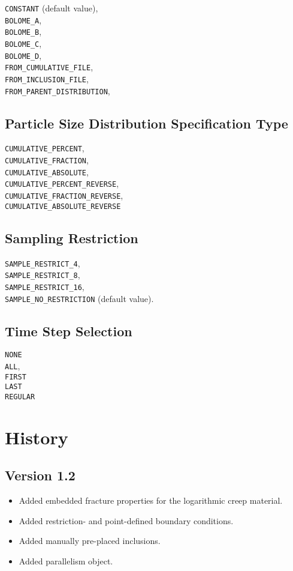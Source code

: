 \documentclass[10pt]{article}
\begin{document}
\verb+CONSTANT+ (default value),\\
\verb+BOLOME_A+,\\
\verb+BOLOME_B+,\\
\verb+BOLOME_C+,\\
\verb+BOLOME_D+,\\
\verb+FROM_CUMULATIVE_FILE+,\\
\verb+FROM_INCLUSION_FILE+,\\
\verb+FROM_PARENT_DISTRIBUTION+,\\

\subsection{Particle Size Distribution Specification Type}
	\verb+CUMULATIVE_PERCENT+,\\
	\verb+CUMULATIVE_FRACTION+,\\
	\verb+CUMULATIVE_ABSOLUTE+,\\
	\verb+CUMULATIVE_PERCENT_REVERSE+,\\
	\verb+CUMULATIVE_FRACTION_REVERSE+,\\
	\verb+CUMULATIVE_ABSOLUTE_REVERSE+


\subsection{Sampling Restriction}

		\verb+SAMPLE_RESTRICT_4+,\\
		\verb+SAMPLE_RESTRICT_8+,\\
		\verb+SAMPLE_RESTRICT_16+,\\
		\verb+SAMPLE_NO_RESTRICTION+ (default value).



\subsection{Time Step Selection}
	\verb+NONE+\\
	\verb+ALL+,\\
	\verb+FIRST+\\
	\verb+LAST+\\
	\verb+REGULAR+


\section{History}

\subsection*{Version 1.2}
\begin{itemize}
	\item Added embedded fracture properties for the logarithmic creep material.
	\item Added restriction- and point-defined boundary conditions.
	\item Added manually pre-placed inclusions.
	\item Added parallelism object.
\end{itemize}
\end{document}
